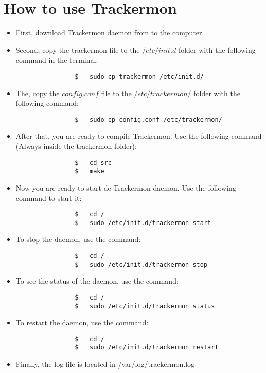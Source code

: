 \documentclass[10pt]{article}
\begin{document}
\section{How to use Trackermon}
\begin{center}
    \begin{itemize}
        \item First, download Trackermon daemon from to the computer.
        \item Second, copy the trackermon file to the $/etc/init.d$ folder with the following command in the terminal:
            \begin{verbatim}
                $   sudo cp trackermon /etc/init.d/
            \end{verbatim}
        \item The, copy the $config.conf$ file to the $/etc/trackermon/$ folder with the following command:
            \begin{verbatim}
                $   sudo cp config.conf /etc/trackermon/
            \end{verbatim}
        \item After that, you are ready to compile Trackermon. Use the following command (Always inside the trackermon folder):
            \begin{verbatim}
                $   cd src
                $   make
            \end{verbatim}
        \item Now you are ready to start de Trackermon daemon. Use the following command to start it:
            \begin{verbatim}
                $   cd /
                $   sudo /etc/init.d/trackermon start
            \end{verbatim}
        \item To stop the daemon, use the command:
            \begin{verbatim}
                $   cd /
                $   sudo /etc/init.d/trackermon stop
            \end{verbatim}
        \item To see the status of the daemon, use the command:
            \begin{verbatim}
                $   cd /
                $   sudo /etc/init.d/trackermon status
            \end{verbatim}
        \item To restart the daemon, use the command:
            \begin{verbatim}
                $   cd /
                $   sudo /etc/init.d/trackermon restart
            \end{verbatim}
        \item Finally, the log file is located in /var/log/trackermon.log
    \end{itemize}
\end{center}
\end{document}
